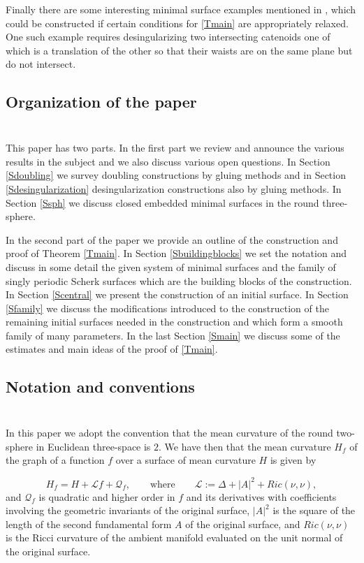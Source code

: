 \documentclass[12pt,namelimits,sumlimits]{amsart}
\theoremstyle{remark}
\numberwithin{equation}{section}
\begin{document}
Finally there are some interesting minimal surface
examples mentioned in \cite{kapouleas:survey},
which could be constructed if certain conditions for \ref{Tmain} are appropriately relaxed.
One such example requires desingularizing two intersecting catenoids
one of which is a translation of the other so that their waists are on the same plane but do not intersect.

\subsection*{Organization of the paper}
$\phantom{ab}$
\nopagebreak

This paper has two parts.
In the first part we review and announce the various results in the subject
and we also discuss various open questions.
In Section \ref{Sdoubling} we survey doubling constructions by gluing methods
and in Section \ref{Sdesingularization} desingularization constructions also by gluing methods.
In Section \ref{Ssph} we discuss closed embedded minimal surfaces in the round three-sphere.

In the second part of the paper we provide an outline of the construction and proof of Theorem \ref{Tmain}.
In Section \ref{Sbuildingblocks} we set the notation 
and discuss in some detail the given system of minimal surfaces and the family of singly periodic Scherk surfaces
which are the building blocks of the construction.
In Section \ref{Scentral} we present the construction of an initial surface.
In Section \ref{Sfamily} we discuss the modifications introduced to the construction of the remaining
initial surfaces needed in the construction and which form a smooth family of many parameters.
In the last Section \ref{Smain} we discuss some of the estimates and main ideas of the proof of \ref{Tmain}.

\subsection*{Notation and conventions}
$\phantom{ab}$
\nopagebreak

In this paper we adopt the convention that the mean curvature of the round two-sphere in Euclidean
three-space is $2$.
We have then that the mean curvature $H_f$ of the graph of a function $f$ over a surface of mean curvature $H$
is given by
\addtocounter{theorem}{1}
\begin{equation}
\label{EHf}
H_f=H+{\ensuremath{\mathcal L}} f + \mathcal{Q}_f,
\qquad
\text{where}
\qquad
{\ensuremath{\mathcal L}}:=\Delta+|A|^2+Ric(\nu,\nu),
\end{equation}
and $\mathcal{Q}_f$ is quadratic and higher order in $f$ and its derivatives
with coefficients involving the geometric invariants of the original surface,
$|A|^2$ is the square of the length of the second fundamental form $A$ of the original surface,
and $Ric(\nu,\nu)$ is the Ricci curvature of the ambient manifold evaluated on the unit normal of 
the original surface.
\end{document}
